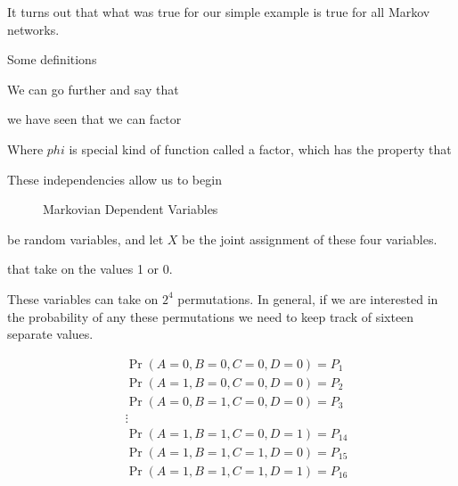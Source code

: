 \documentclass{article}
\begin{document}
It turns out that what was true for our simple example is true for all
Markov networks. 

Some definitions



We can go further 
and say that 

we have seen that we can factor 


Where $phi$ is special kind of function called a factor, which has the
property that 

These independencies allow us to begin 



\begin{figure}
\centering
{}
\caption{Markovian Dependent Variables}
\end{figure}



 be random variables, and let $X$ be the
joint assignment of these four variables.



 that take
on the values 1 or 0.



These variables can take on $2^4$ permutations. In general, if we are
interested in the probability of any these permutations we need to
keep track of sixteen separate values.

\begin{align*}
&\Pr(A=0,B=0,C=0,D=0) = P_1 \\
&\Pr(A=1,B=0,C=0,D=0) = P_2 \\
&\Pr(A=0,B=1,C=0,D=0) = P_3 \\
&\vdots \\
&\Pr(A=1,B=1,C=0,D=1) = P_{14} \\
&\Pr(A=1,B=1,C=1,D=0) = P_{15} \\
&\Pr(A=1,B=1,C=1,D=1) = P_{16} 
\end{align*}
\end{document}
